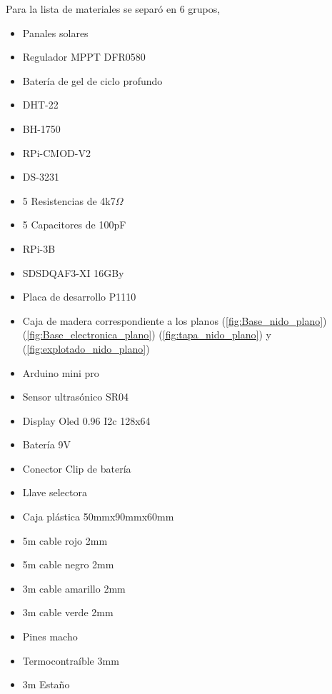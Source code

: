 Para la lista de materiales se separó en 6 grupos, 
\begin{itemize}

\item Panales solares \TBD
\item Regulador MPPT DFR0580
\item Bater\'ia de gel de ciclo profundo \TBD 
\end{itemize}
\begin{itemize}
\item DHT-22 
\item BH-1750
\item RPi-CMOD-V2
\item DS-3231
\item 5 Resistencias de 4k7$\Omega$ 
\item 5 Capacitores de 100pF
\end{itemize}
\begin{itemize}
\item RPi-3B
\item SDSDQAF3-XI 16GBy
\end{itemize}

\begin{itemize}

\item Placa de desarrollo P1110
\item Caja de madera correspondiente a los planos (\ref{fig:Base_nido_plano}) (\ref{fig:Base_electronica_plano}) (\ref{fig:tapa_nido_plano}) y (\ref{fig:explotado_nido_plano})
\item Arduino mini pro
\item Sensor ultras\'onico SR04
\item Display Oled 0.96 I2c 128x64
\item Bater\'ia 9V
\item Conector Clip de bater\'ia
\item Llave selectora
\item Caja pl\'astica 50mmx90mmx60mm

\end{itemize}
\begin{itemize}
\item 5m cable rojo 2mm
\item 5m cable negro 2mm
\item 3m cable amarillo 2mm
\item 3m cable verde 2mm
\item Pines macho
\item Termocontra\'ible 3mm
\item 3m Estaño

\end{itemize}









